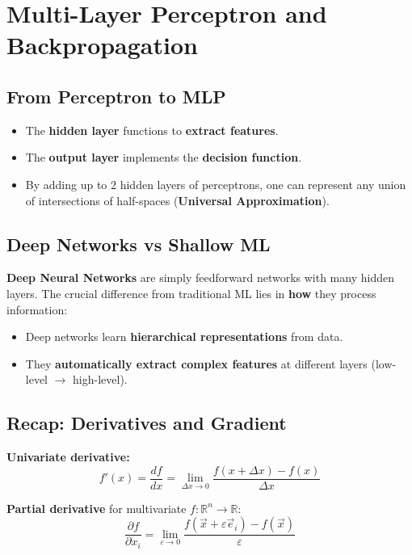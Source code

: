 \documentclass[11pt,a4paper]{article}
\newcommand{\R}{\mathbb{R}}
\newcommand{\vx}{\vec{x}}
\begin{document}
\section{Multi-Layer Perceptron and Backpropagation}

\subsection{From Perceptron to MLP}

\begin{itemize}[leftmargin=*]
    \item The \textbf{hidden layer} functions to \textbf{extract features}.
    \item The \textbf{output layer} implements the \textbf{decision function}.
    \item By adding up to 2 hidden layers of perceptrons, one can represent any union of intersections of half-spaces (\textbf{Universal Approximation}).
\end{itemize}

\subsection{Deep Networks vs Shallow ML}

\textbf{Deep Neural Networks} are simply feedforward networks with many hidden layers. The crucial difference from traditional ML lies in \textbf{how} they process information:
\begin{itemize}[leftmargin=*]
    \item Deep networks learn \textbf{hierarchical representations} from data.
    \item They \textbf{automatically extract complex features} at different layers (low-level $\to$ high-level).
\end{itemize}

\subsection{Recap: Derivatives and Gradient}

\textbf{Univariate derivative:}
\[
f'(x) = \frac{df}{dx} = \lim_{\Delta x \to 0}\frac{f(x+\Delta x)-f(x)}{\Delta x}
\]

\textbf{Partial derivative} for multivariate $f:\R^n \to \R$:
\[
\frac{\partial f}{\partial x_i} = \lim_{\varepsilon \to 0}\frac{f(\vx + \varepsilon \vec{e}_i) - f(\vx)}{\varepsilon}
\]
\end{document}
